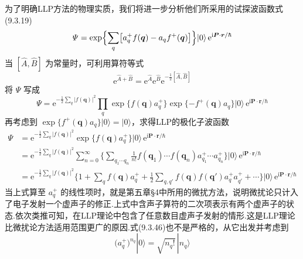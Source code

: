 为了明确LLP方法的物理实质，我们将进一步分析他们所采用的试探波函数式(9.3.19)
\begin{equation}
  \varPsi=\exp\Bigl\{\sum_{q}\bigl[a_{q}^{+}f(\boldsymbol{q})
  -a_{q}f^{+}(\boldsymbol{q})\bigr]\Bigr\}|0\rangle\,
  \mathrm{e}^{\mathrm{i}\boldsymbol{P}\cdot\boldsymbol{r}/\hbar}
\end{equation}
当 $[\hat{A},\hat{B}]$ 为常量时，可利用算符等式
\begin{equation}
  \mathrm{e}^{\hat{A}+\hat{B}}
  =\mathrm{e}^{\hat{A}}\mathrm{e}^{\hat{B}}
  \mathrm{e}^{-\frac{1}{2}[\hat{A},\hat{B}]}
\end{equation}
将 $\varPsi$ 写成
\begin{equation*}
  \varPsi=\mathrm{e}^{-\frac{1}{2}\sum_{q}|f(\boldsymbol{q})|^{2}}
  \prod_{q}\exp\{f(\boldsymbol{q})a_{q}^{+}\}
  \exp\{-f^{+}(\boldsymbol{q})a_{q}\}|0\rangle\,
  \mathrm{e}^{\mathrm{i}\boldsymbol{P}\cdot\boldsymbol{r}/\hbar}
\end{equation*}
再考虑到 $\exp\{f^{+}(\boldsymbol{q})a_{q}\}|0\rangle=|0\rangle$，求得LLP的极化子波函数
\begin{equation}
\begin{aligned}
  \varPsi&=\mathrm{e}^{-\frac{1}{2}\sum\limits_{q}|f(\boldsymbol{q})|^{2}}
  \exp\{f(\boldsymbol{q})a_{q}^{+}\}|0\rangle\,
  \mathrm{e}^{\mathrm{i}\boldsymbol{P}\cdot\boldsymbol{r}/\hbar}\\
  &=\mathrm{e}^{-\frac{1}{2}\sum\limits_{q}|f(\boldsymbol{q})|^{2}}
  \sum_{n=0}^{\infty}\biggl\{\sum_{q_{1}\cdots q_{n}}
  \frac{1}{n!}f(\boldsymbol{q}_{1})\cdots f(\boldsymbol{q}_{n})
  a_{q_{1}}^{+}\cdots a_{q_{n}}^{+}\biggr\}|0\rangle\,
  \mathrm{e}^{\mathrm{i}\boldsymbol{P}\cdot\boldsymbol{r}/\hbar}\\
  &=\mathrm{e}^{-\frac{1}{2}\sum\limits_{q}|f(\boldsymbol{q})|^{2}}
  \biggl\{1+\sum_{q}f(\boldsymbol{q})a_{q}^{+}
  +\frac{1}{2}\sum_{q,q'}f(\boldsymbol{q})f(\boldsymbol{q}')
  a_{q}^{+}a_{q'}^{+}+\cdots\biggr\}|0\rangle\,
  \mathrm{e}^{\mathrm{i}\boldsymbol{P}\cdot\boldsymbol{r}/\hbar}
\end{aligned}
\end{equation}
当上式算至 $a_{q}^{+}$ 的线性项时，就是第五章§4中所用的微扰方法，说明微扰论只计入了电子发射一个虚声子的修正.上式中含声子算符的二次项表示有两个虚声子的状态.依次类推可知，在LLP理论中包含了任意数目虚声子发射的情形.这是LLP理论比微扰论方法适用范围更广的原因.式(9.3.46)也不是严格的，从它出发并考虑到
\begin{equation*}
  \bigl(a_{q}^{+}\bigr)^{n_{q}}|0\rangle=\sqrt{n_{q}!}\,|n_{q}\rangle
\end{equation*}
